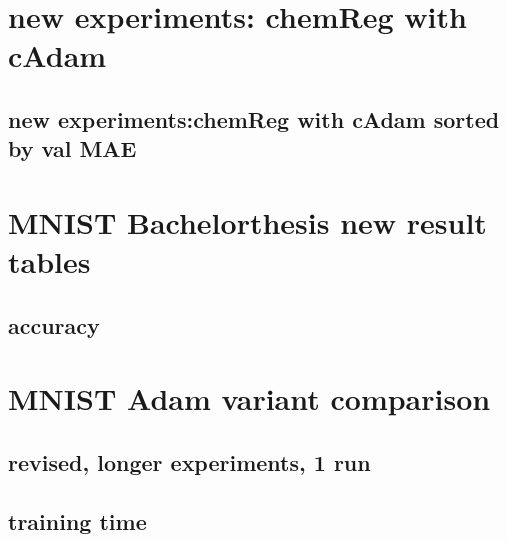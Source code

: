

\section{new experiments: chemReg with cAdam}
\subsection{new experiments:chemReg with cAdam sorted by val MAE}






\section{MNIST Bachelorthesis new result tables}
\subsection{accuracy}






\section{MNIST Adam variant comparison}
\subsection{revised, longer experiments, 1 run}
\subsection{training time}





